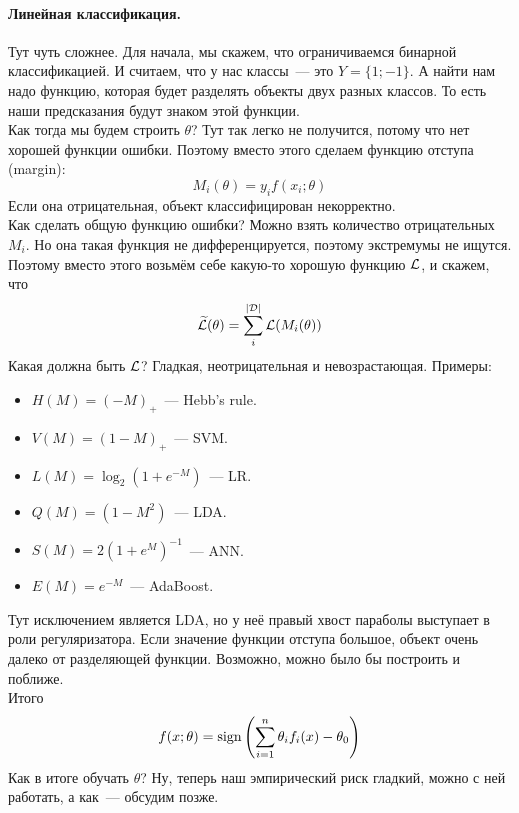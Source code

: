 \documentclass{article}
\begin{document}
    \paragraph{Линейная классификация.}
    Тут чуть сложнее. Для начала, мы скажем, что ограничиваемся бинарной классификацией. И считаем, что у нас классы~--- это $Y=\{1;-1\}$. А найти нам надо функцию, которая будет разделять объекты двух разных классов. То есть наши предсказания будут знаком этой функции.\\
    Как тогда мы будем строить $\theta$? Тут так легко не получится, потому что нет хорошей функции ошибки. Поэтому вместо этого сделаем функцию отступа (margin):
    \[
    M_i(\theta)=y_if(x_i;\theta)
    \]
    Если она отрицательная, объект классифицирован некорректно.\\
    Как сделать общую функцию ошибки? Можно взять количество отрицательных $M_i$. Но она такая функция не дифференцируется, поэтому экстремумы не ищутся.\\
    Поэтому вместо этого возьмём себе какую-то хорошую функцию ${\mathcal{L}}$, и скажем, что
    \[
    \widetilde{{\mathcal{L}}}(\theta)=\sum\limits_i^{|{\mathcal{D}}|}{\mathcal{L}}(M_i(\theta))
    \]
    Какая должна быть ${\mathcal{L}}$? Гладкая, неотрицательная и невозрастающая. Примеры:
    \begin{itemize}
        \item $H(M)=(-M)_+$~--- Hebb's rule.
        \item $V(M)=(1-M)_+$~--- SVM.
        \item $L(M)=\log_2(1+e^{-M})$~--- LR.
        \item $Q(M)=(1-M^2)$~--- LDA.
        \item $S(M)=2(1+e^{M})^{-1}$~--- ANN.
        \item $E(M)=e^{-M}$~--- AdaBoost.
    \end{itemize}
    Тут исключением является LDA, но у неё правый хвост параболы выступает в роли регуляризатора. Если значение функции отступа большое, объект очень далеко от разделяющей функции. Возможно, можно было бы построить и поближе.\\
    Итого
    \[
    f(x;\theta)=\operatorname{sign}\left(\sum\limits_{i=1}^n\theta_if_i(x)-\theta_0\right)
    \]
    Как в итоге обучать $\theta$? Ну, теперь наш эмпирический риск гладкий, можно с ней работать, а как~--- обсудим позже.
\end{document}
